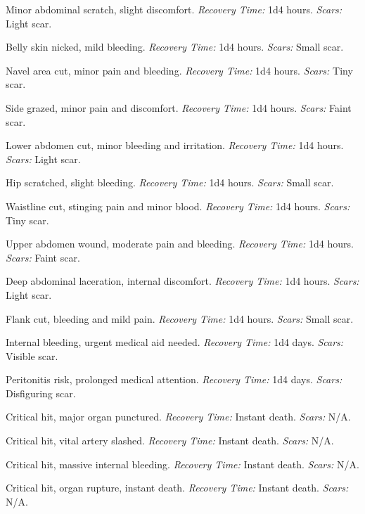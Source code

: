 \documentclass[12pt]{book}  %
\begin{document}
\begin{description}[labelwidth=1.5em, leftmargin=*, itemsep=0.4em]
    \item[1 -] Minor abdominal scratch, slight discomfort. \textit{Recovery Time:} 1d4 hours. \textit{Scars:} Light scar.
    \item[2 -] Belly skin nicked, mild bleeding. \textit{Recovery Time:} 1d4 hours. \textit{Scars:} Small scar.
    \item[3 -] Navel area cut, minor pain and bleeding. \textit{Recovery Time:} 1d4 hours. \textit{Scars:} Tiny scar.
    \item[4 -] Side grazed, minor pain and discomfort. \textit{Recovery Time:} 1d4 hours. \textit{Scars:} Faint scar.
    \item[5 -] Lower abdomen cut, minor bleeding and irritation. \textit{Recovery Time:} 1d4 hours. \textit{Scars:} Light scar.
    \item[6 -] Hip scratched, slight bleeding. \textit{Recovery Time:} 1d4 hours. \textit{Scars:} Small scar.
    \item[7 -] Waistline cut, stinging pain and minor blood. \textit{Recovery Time:} 1d4 hours. \textit{Scars:} Tiny scar.
    \item[8 -] Upper abdomen wound, moderate pain and bleeding. \textit{Recovery Time:} 1d4 hours. \textit{Scars:} Faint scar.
    \item[9 -] Deep abdominal laceration, internal discomfort. \textit{Recovery Time:} 1d4 hours. \textit{Scars:} Light scar.
    \item[10 -] Flank cut, bleeding and mild pain. \textit{Recovery Time:} 1d4 hours. \textit{Scars:} Small scar.
    \item[11 -] Internal bleeding, urgent medical aid needed. \textit{Recovery Time:} 1d4 days. \textit{Scars:} Visible scar.
    \item[12 -] Peritonitis risk, prolonged medical attention. \textit{Recovery Time:} 1d4 days. \textit{Scars:} Disfiguring scar.
    \item[13 -] Critical hit, major organ punctured. \textit{Recovery Time:} Instant death. \textit{Scars:} N/A.
    \item[14 -] Critical hit, vital artery slashed. \textit{Recovery Time:} Instant death. \textit{Scars:} N/A.
    \item[15 -] Critical hit, massive internal bleeding. \textit{Recovery Time:} Instant death. \textit{Scars:} N/A.
    \item[16 -] Critical hit, organ rupture, instant death. \textit{Recovery Time:} Instant death. \textit{Scars:} N/A.

\end{description}
\end{document}
